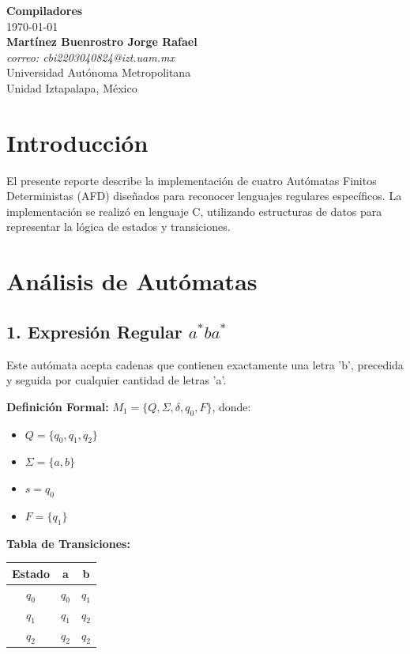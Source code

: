 \documentclass[letterpaper,11pt,twoside]{article}
\begin{document}
	
	\begin{center}
		{\bf \Large Compiladores} \\
		\today \\
		\vspace{0.5cm}
		\textbf{Martínez Buenrostro Jorge Rafael} \\
		\textit{correo: cbi2203040824@izt.uam.mx} \\
		Universidad Autónoma Metropolitana \\
		Unidad Iztapalapa, México
	\end{center}
	
	\section*{Introducción}
	El presente reporte describe la implementación de cuatro Autómatas Finitos Deterministas (AFD) diseñados para reconocer lenguajes regulares específicos. La implementación se realizó en lenguaje C, utilizando estructuras de datos para representar la lógica de estados y transiciones.
		
	\section*{Análisis de Autómatas}
	
	\subsection*{1. Expresión Regular $a^*ba^*$}
	Este autómata acepta cadenas que contienen exactamente una letra 'b', precedida y seguida por cualquier cantidad de letras 'a'.
	
	\textbf{Definición Formal:}
	$M_1 = \{Q, \Sigma, \delta, q_0, F\}$, donde:
	\begin{itemize}
		\item $Q = \{q_0, q_1, q_2\}$
		\item $\Sigma = \{a, b\}$
		\item $s = q_0$
		\item $F = \{q_1\}$
	\end{itemize}
	
	\textbf{Tabla de Transiciones:}
	\begin{table}[H]
		\centering
		\begin{tabular}{|c|c|c|}
			\hline
			Estado & \textbf{a} & \textbf{b} \\ \hline
			$q_0$  & $q_0$      & $q_1$      \\ \hline
			$q_1$  & $q_1$      & $q_2$		 \\ \hline
			$q_2$  & $q_2$      & $q_2$      \\ \hline
		\end{tabular}
	\end{table}
	
\end{document}
